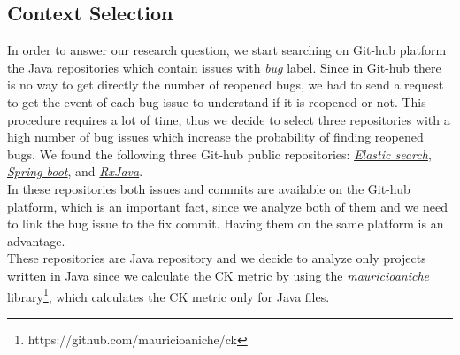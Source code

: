 \documentclass[sigconf,review]{acmart}
\begin{document}
\subsection{Context Selection}
In order to answer our research question, we start searching on Git-hub platform the Java repositories which contain issues with \emph{bug} label. Since in Git-hub there is no way to get directly the number of reopened bugs, we had to send a request to get the event of each bug issue to understand if it is reopened or not. This procedure requires a lot of time, thus we decide to select three repositories with a high number of bug issues which increase the probability of finding reopened bugs. We found the following three Git-hub public repositories: \href{https://github.com/elastic/elasticsearch}{\emph{Elastic search}}, \href{https://github.com/spring-projects/spring-boot}{\emph{Spring boot}}, and \href{https://github.com/ReactiveX/RxJava}{\emph{RxJava}}.\\
In these repositories both issues and commits are available on the Git-hub platform, which is an important fact, since we analyze both of them and we need to link the bug issue to the fix commit. Having them on the same platform is an advantage.\\
These repositories are Java repository and we decide to analyze only projects written in Java since we calculate the CK metric by using the  \href{https://github.com/mauricioaniche/ck}{\emph{mauricioaniche}} library\footnote{https://github.com/mauricioaniche/ck}, which calculates the CK metric only for Java files.
\end{document}
